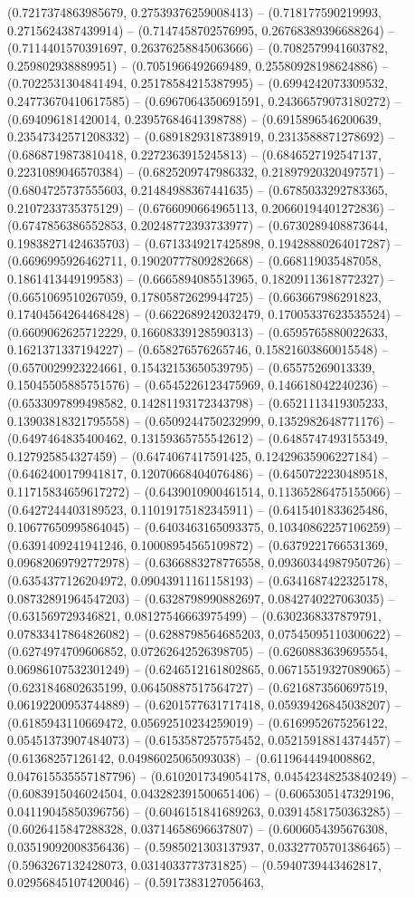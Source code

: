 (0.7217374863985679, 0.27539376259008413) -- (0.718177590219993, 0.2715624387439914) -- (0.7147458702576995, 0.26768389396688264) -- (0.7114401570391697, 0.26376258845063666) -- (0.7082579941603782, 0.259802938889951) -- (0.7051966492669489, 0.25580928198624886) -- (0.7022531304841494, 0.25178584215387995) -- (0.6994242073309532, 0.24773670410617585) -- (0.6967064350691591, 0.24366579073180272) -- (0.694096181420014, 0.23957684641398788) -- (0.6915896546200639, 0.23547342571208332) -- (0.6891829318738919, 0.2313588871278692) -- (0.6868719873810418, 0.2272363915245813) -- (0.6846527192547137, 0.2231089046570384) -- (0.6825209747986332, 0.21897920320497571) -- (0.6804725737555603, 0.21484988367441635) -- (0.6785033292783365, 0.2107233735375129) -- (0.6766090664965113, 0.20660194401272836) -- (0.6747856386552853, 0.20248772393733977) -- (0.6730289408873644, 0.19838271424635703) -- (0.6713349217425898, 0.19428880264017287) -- (0.6696995926462711, 0.19020777809282668) -- (0.668119035487058, 0.1861413449199583) -- (0.6665894085513965, 0.18209113618772327) -- (0.6651069510267059, 0.17805872629944725) -- (0.663667986291823, 0.17404564264468428) -- (0.6622689242032479, 0.17005337623535524) -- (0.6609062625712229, 0.16608339128590313) -- (0.6595765880022633, 0.1621371337194227) -- (0.658276576265746, 0.15821603860015548) -- (0.6570029923224661, 0.15432153650539795) -- (0.65575269013339, 0.15045505885751576) -- (0.6545226123475969, 0.146618042240236) -- (0.6533097899498582, 0.14281193172343798) -- (0.6521113419305233, 0.13903818321795558) -- (0.6509244750232999, 0.1352982648771176) -- (0.6497464835400462, 0.13159365755542612) -- (0.6485747493155349, 0.127925854327459) -- (0.6474067417591425, 0.12429635906227184) -- (0.6462400179941817, 0.12070668404076486) -- (0.6450722230489518, 0.11715834659617272) -- (0.6439010900461514, 0.11365286475155066) -- (0.6427244403189523, 0.11019175182345911) -- (0.6415401833625486, 0.10677650995864045) -- (0.6403463165093375, 0.10340862257106259) -- (0.6391409241941246, 0.10008954565109872) -- (0.6379221766531369, 0.09682069792772978) -- (0.6366883278776558, 0.09360344987950726) -- (0.6354377126204972, 0.09043911161158193) -- (0.6341687422325178, 0.08732891964547203) -- (0.6328798990882697, 0.0842740227063035) -- (0.631569729346821, 0.08127546663975499) -- (0.6302368337879791, 0.07833417864826082) -- (0.6288798564685203, 0.07545095110300622) -- (0.6274974709606852, 0.07262642526398705) -- (0.6260883639695554, 0.06986107532301249) -- (0.6246512161802865, 0.06715519327089065) -- (0.6231846802635199, 0.06450887517564727) -- (0.6216873560697519, 0.06192200953744889) -- (0.6201577631717418, 0.05939426845038207) -- (0.6185943110669472, 0.05692510234259019) -- (0.6169952675256122, 0.05451373907484073) -- (0.6153587257575452, 0.05215918814374457) -- (0.61368257126142, 0.04986025065093038) -- (0.6119644494008862, 0.047615535557187796) -- (0.6102017349054178, 0.04542348253840249) -- (0.6083915046024504, 0.043282391500651406) -- (0.6065305147329196, 0.04119045850396756) -- (0.6046151841689263, 0.03914581750363285) -- (0.6026415847288328, 0.03714658696637807) -- (0.6006054395676308, 0.03519092008356436) -- (0.5985021303137937, 0.03327705701386465) -- (0.5963267132428073, 0.0314033773731825) -- (0.5940739443462817, 0.02956845107420046) -- (0.5917383127056463, 